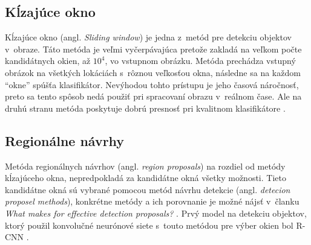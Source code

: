 \begin{comment}
    \subsubsection{Vyhľadávač na základe vizuálnej podobnosti obrázkov}
    Jednu z~možných aplikácií detekcie objektov v~obraze využíva Pinterest\footnote{\url{https://medium.com/@Pinterest_Engineering/introducing-automatic-object-detection-to-visual-search-e57c29191c30}}.
    Používaju detekciu objektov pre indexovanie rôznych častí obrázka.
    Týmto spôsobom si môže užívateľ pri hľadaní napr. špecifickej kabelky alebo topánok nájsť aj jej podobné.
    \begin{figure}[H]
        \centering
        \texttt{[image: purse]}
        \caption{Prototyp automatického označovania a vyhľadávania objektov \cite{odkaz:ObjectDetectionOverview}}
        \label{pic:kNN}
    \end{figure}
\end{comment}

\subsection{Kĺzajúce okno}
\label{subsec:slidingwindow}
Kĺzajúce okno (angl. \textit{Sliding window}) je jedna z~metód pre detekciu objektov v~obraze.
Táto metóda je veľmi vyčerpávajúca pretože zakladá na veľkom počte kandidátnych okien, až $10^4$, vo vstupnom obrázku.
Metóda prechádza vstupný obrázok na všetkých lokáciách s~rôznou veľkosťou okna, následne sa na každom ``okne'' spúšťa klasifikátor.
Nevýhodou tohto prístupu je jeho časová náročnosť, preto sa tento spôsob nedá použiť pri spracovaní obrazu v~reálnom čase.
Ale na druhú stranu metóda poskytuje dobrú presnosť pri kvalitnom klasifikátore \cite{prop:AutomaticHandgunDetection}.

\subsection{Regionálne návrhy}
\label{subsec:regionproposal}
Metóda regionálnych návrhov (angl. \textit{region proposals}) na rozdiel od metódy kĺzajúceho okna, nepredpokladá za kandidátne okná všetky možnosti.
Tieto kandidátne okná sú vybrané pomocou metód návrhu detekcie (angl. \textit{detecion proposel methods}), konkrétne metódy
    a ich porovnanie je možné nájsť v~članku \textit{What makes for effective detection proposals?} \cite{prop:ProposalMethods}.
Prvý model na detekciu objektov, ktorý použil konvolučné neurónové siete s~touto metódou pre výber okien bol R-CNN \cite{prop:AutomaticHandgunDetection}.
